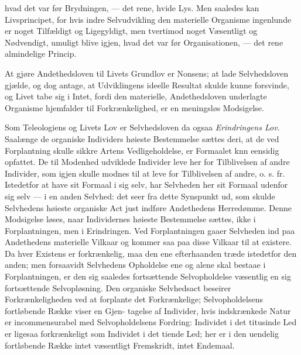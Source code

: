 \documentclass[12pt,a4paper]{book}
\begin{document}
hvad det var før Brydningen, --- det rene, hvide Lys. Men
saaledes kan Livsprincipet, for hvis indre Selvudvikling den materielle
Organisme ingenlunde er noget Tilfældigt og Ligegyldigt, men tvertimod
noget Væsentligt og Nødvendigt, umuligt blive igjen, hvad det var før
Organisationen, --- det rene almindelige Princip.

At gjøre Andethedsloven til Livets Grundlov er Nonsens; at lade
Selvhedsloven gjælde, og dog antage, at Udviklingens ideelle Resultat
skulde kunne forsvinde, og Livet tabe sig i Intet, fordi den materielle,
Andethedsloven underlagte Organisme hjemfalder til Forkrænkelighed, er
en meningsløs Modsigelse.

Som Teleologiens og Livets Lov er Selvhedsloven da ogsaa
\emph{Erindringens Lov.} Saalænge de organiske Individers høieste
Bestemmelse sættes deri, at de ved Forplantning skulle sikkre Artens
Vedligeholdelse, er Formaalet knn eensidig opfattet.
De til Modenhed
udviklede Individer leve her for Tilblivelsen af andre Individer, som
igjen skulle modnes til at leve for Tilblivelsen af andre, o. s. fr.
Istedetfor at have sit Formaal i sig selv, har Selvheden her sit Formaal
udenfor sig selv --- i en anden Selvhed: det seer fra dette Synspunkt
ud, som skulde Selvhedens høieste organiske Act just indføre Andethedens
Herredømme. Denne Modsigelse løses, naar Individernes høieste
Bestemmelse sættes, ikke i Forplantningen, men i Erindringen. Ved
Forplantningen gaaer Selvheden ind paa Andethedens materielle Vilkaar og
kommer saa paa disse Vilkaar til at existere. Da hver Existens er
forkrænkelig, maa den ene efterhaanden træde istedetfor den anden; men
forsaavidt Selvhedens Opholdelse ene og alene skal bestaae i
Forplantningen, er den sig saaledes fortsættende Selvopholdelse
væsentlig en sig fortsættende Selvopløsning. Den organiske Selvhedsact
beseirer Forkrænkeligheden ved at forplante det Forkrænkelige;
Selvopholdelsens fortløbende Række viser en Gjen-
tagelse af Individer, hvis indskrænkede Natur er incommensurabel med
Selvopholdelsens Fordring: Individet i det titusinde Led er ligesaa
forkrænkeligt som Individet i det tiende Led; her er i den uendelig
fortløbende Række intet væsentligt Fremskridt, intet Endemaal.
\end{document}
